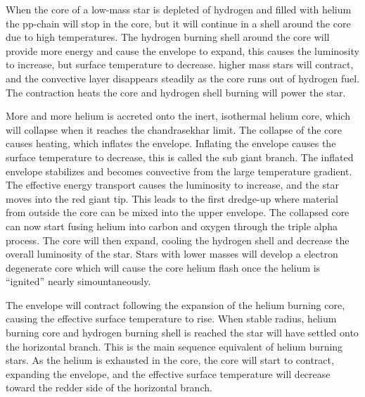 When the core of a low-mass star is depleted of hydrogen and filled with helium the pp-chain will stop in the core, but it will continue in a shell around the core due to high temperatures. The hydrogen burning shell around the core will provide more energy and cause the envelope to expand, this causes the luminosity to increase, but surface temperature to decrease.
higher mass stars will contract, and the convective layer disappears steadily as the core runs out of hydrogen fuel. The contraction heats the core and hydrogen shell burning will power the star.

More and more helium is accreted onto the inert, isothermal helium core, which will collapse when it reaches the chandrasekhar limit.
The collapse of the core causes heating, which inflates the envelope.
Inflating the envelope causes the surface temperature to decrease, this is called the sub giant branch.
The inflated envelope stabilizes and becomes convective from the large temperature gradient.
The effective energy transport causes the luminosity to increase, and the star moves into the red giant tip.
This leads to the first dredge-up where material from outside the core can be mixed into the upper envelope.
The collapsed core can now start fusing helium into carbon and oxygen through the triple alpha process.
The core will then expand, cooling the hydrogen shell and decrease the overall luminosity of the star. Stars with lower masses will develop a electron degenerate core which will cause the core helium flash once the helium is ``ignited'' nearly simountaneously.

The envelope will contract following the expansion of the helium burning core, causing the effective surface temperature to rise. When stable radius, helium burning core and hydrogen burning shell is reached the star will have settled onto the horizontal branch. This is the main sequence equivalent of helium burning stars. As the helium is exhausted in the core, the core will start to contract, expanding the envelope, and the effective surface temperature will decrease toward the redder side of the horizontal branch.

